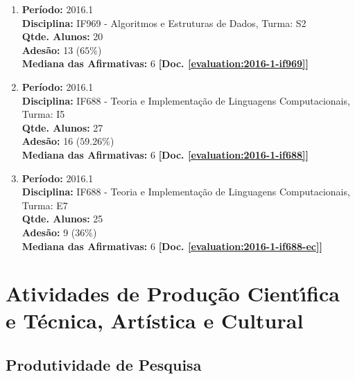 \documentclass[a4paper,oneside,10pt]{article}
\begin{document}
\begin{enumerate}
\item   \textbf{Período:} 2016.1 \\
        \textbf{Disciplina:} IF969 - Algoritmos e Estruturas de Dados, Turma: S2\\
        \textbf{Qtde. Alunos:} 20\\
        \textbf{Adesão:} 13 ($65\%$)\\
        \textbf{Mediana das Afirmativas:} 6 \textbf{[Doc. \ref{evaluation:2016-1-if969}]}

\item   \textbf{Período:} 2016.1 \\
        \textbf{Disciplina:} IF688 - Teoria e Implementação de Linguagens Computacionais, Turma: I5\\
        \textbf{Qtde. Alunos:} 27\\
        \textbf{Adesão:} 16 ($59.26\%$)\\
        \textbf{Mediana das Afirmativas:} 6 \textbf{[Doc. \ref{evaluation:2016-1-if688}]}

\item   \textbf{Período:} 2016.1 \\
        \textbf{Disciplina:} IF688 - Teoria e Implementação de Linguagens Computacionais, Turma: E7\\
        \textbf{Qtde. Alunos:} 25\\
        \textbf{Adesão:} 9 ($36\%$)\\
        \textbf{Mediana das Afirmativas:} 6 \textbf{[Doc. \ref{evaluation:2016-1-if688-ec}]}



\end{enumerate}

\newpage
\section{Atividades de Produ\c{c}\~{a}o Cient\'{\i}fica e T\'{e}cnica, Art\'{i}stica e Cultural}

\subsection{Produtividade de Pesquisa}
\vspace{0.3cm}
\end{document}
